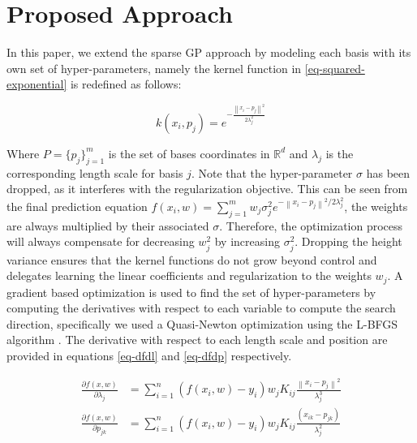 \documentclass[useAMS,usenatbib,fleqn]{mn2e}
\begin{document}
\section{Proposed Approach}
\label{sec-proposed-approach}

In this paper, we extend the sparse GP approach by modeling each basis with its own set of hyper-parameters, namely the kernel function in \eqref{eq-squared-exponential} is redefined as follows:

\begin{equation}
\label{eq-squared-exponential-extension}
k(x_{i},p_{j}) = e^{-\frac{\left\| x_{i}-p_{j}\right\|^{2}}{2\lambda_{j}^{2}}}
\end{equation}

Where $P=\{p_{j}\}_{j=1}^{m}$ is the set of bases coordinates in $\mathbb{R}^{d}$ and $\lambda_{j}$ is the corresponding length scale for basis $j$. Note that the hyper-parameter $\sigma$ has been dropped, as it interferes with the regularization objective. This can be seen from the final prediction equation $f(x_{i},w)=\sum_{j=1}^{m}w_{j}\sigma_{j}^{2}e^{-\left\| x_{i}-p_{j}\right\|^{2}/2\lambda_{j}^{2}}$, the weights are always multiplied by their associated $\sigma$. Therefore, the optimization process will always compensate for decreasing $w_{j}^{2}$ by increasing $\sigma_{j}^{2}$. Dropping the height variance ensures that the kernel functions do not grow beyond control and delegates learning the linear coefficients and regularization to the weights $w_{j}$. A gradient based optimization is used to find the set of hyper-parameters by computing the derivatives with respect to each variable to compute the search direction, specifically we used a Quasi-Newton optimization using the L-BFGS algorithm \cite{}. The derivative with respect to each length scale and position are provided in equations \eqref{eq-dfdl} and \eqref{eq-dfdp} respectively. 

\begin{subequations}
\begin{align} 
\label{eq-dfdl}
\frac{\partial f(x,w)}{\partial \lambda_{j}} &= \sum_{i=1}^{n}\left(f(x_{i},w)-y_{i}\right)w_{j}K_{ij}\frac{\left\| x_{i}-p_{j}\right\|^{2}}{\lambda_{j}^{3}}\\
\label{eq-dfdp}
\frac{\partial f(x,w)}{\partial p_{jk}} &= \sum_{i=1}^{n}\left(f(x_{i},w)-y_{i}\right)w_{j}K_{ij}\frac{(x_{ik}-p_{jk})}{\lambda_{j}^{2}}
\end{align}
\end{subequations}
\end{document}
